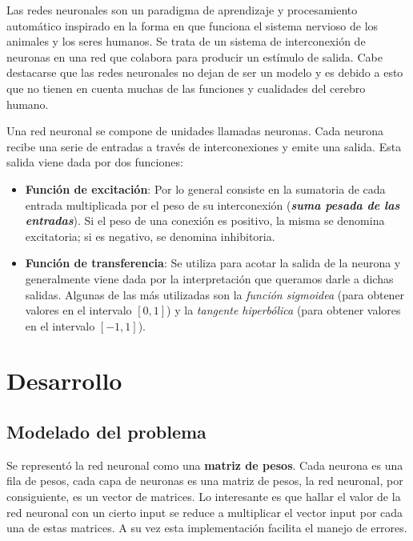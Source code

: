 \documentclass[%
    final,
    reprint,
    notitlepage,
    narroweqnarray,
    inline,
    twoside,
    invited
    ]{ieee}
\begin{document}
\PARstart Las redes neuronales son un paradigma de aprendizaje y procesamiento automático inspirado en la forma en que funciona el sistema nervioso de los animales y los seres humanos. Se trata de un sistema de interconexión de neuronas en una red que colabora para producir un estímulo de salida. Cabe destacarse que las redes neuronales no dejan de ser un modelo y es debido a esto que no tienen en cuenta muchas de las funciones y cualidades del cerebro humano.
\par Una red neuronal se compone de unidades llamadas neuronas. Cada neurona recibe una serie de entradas a través de interconexiones y emite una salida. Esta salida viene dada por dos funciones:
\begin{itemize}
\item \textbf{Función de excitación}: Por lo general consiste en la sumatoria de cada entrada multiplicada por el peso de su interconexión (\textit{\textbf{suma pesada de las entradas}}). Si el peso de una conexión es positivo, la misma se denomina excitatoria; si es negativo, se denomina inhibitoria.
\item \textbf{Función de transferencia}:  Se utiliza para acotar la salida de la neurona y generalmente viene dada por la interpretación que queramos darle a dichas salidas. Algunas de las más utilizadas son la \textit{función sigmoidea} (para obtener valores en el intervalo $[0,1]$) y la \textit{tangente hiperbólica} (para obtener valores en el intervalo $[-1,1]$).
\end{itemize}


\section{Desarrollo}

\subsection{Modelado del problema}

\par Se representó la red neuronal como una \textbf{matriz de pesos}. Cada neurona es una fila de pesos, cada capa de neuronas es una matriz de pesos, la red neuronal, por consiguiente, es un vector de matrices. Lo interesante es que hallar el valor de la red neuronal con un cierto input se reduce a multiplicar el vector input por cada una de estas matrices. A su vez esta implementación facilita el manejo de errores.
\end{document}
